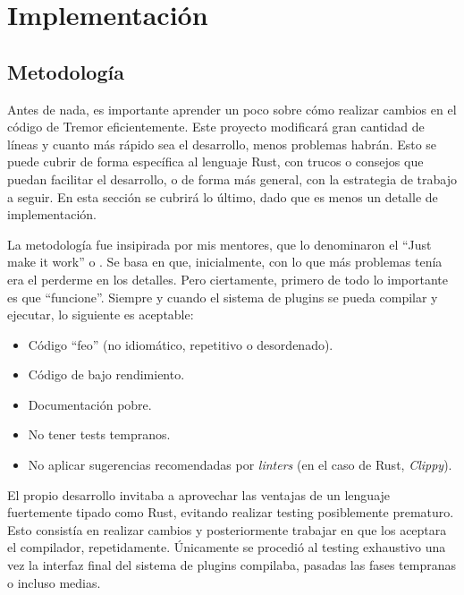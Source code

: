 
\chapter{Implementación}

\section{Metodología}

Antes de nada, es importante aprender un poco sobre cómo realizar cambios en el
código de Tremor eficientemente. Este proyecto modificará gran cantidad de
líneas y cuanto más rápido sea el desarrollo, menos problemas habrán. Esto se
puede cubrir de forma específica al lenguaje Rust, con trucos o consejos que
puedan facilitar el desarrollo, o de forma más general, con la estrategia de
trabajo a seguir. En esta sección se cubrirá lo último, dado que es menos un
detalle de implementación.

La metodología fue insipirada por mis mentores, que lo denominaron el ``Just
make it work'' o \work. Se basa en que, inicialmente, con lo que más problemas
tenía era el perderme en los detalles. Pero ciertamente, primero de todo lo
importante es que ``funcione''. Siempre y cuando el sistema de plugins se pueda
compilar y ejecutar, lo siguiente es aceptable:

\begin{itemize}
    \item Código ``feo'' (no idiomático, repetitivo o desordenado).

    \item Código de bajo rendimiento.

    \item Documentación pobre.

    \item No tener tests tempranos.

    \item No aplicar sugerencias recomendadas por \emph{linters} (en el caso de
        Rust, \emph{Clippy}).

\end{itemize}

El propio desarrollo invitaba a aprovechar las ventajas de un lenguaje
fuertemente tipado como Rust, evitando realizar testing posiblemente prematuro.
Esto consistía en realizar cambios y posteriormente trabajar en que los aceptara
el compilador, repetidamente. Únicamente se procedió al testing exhaustivo una
vez la interfaz final del sistema de plugins compilaba, pasadas las fases
tempranas o incluso medias.


